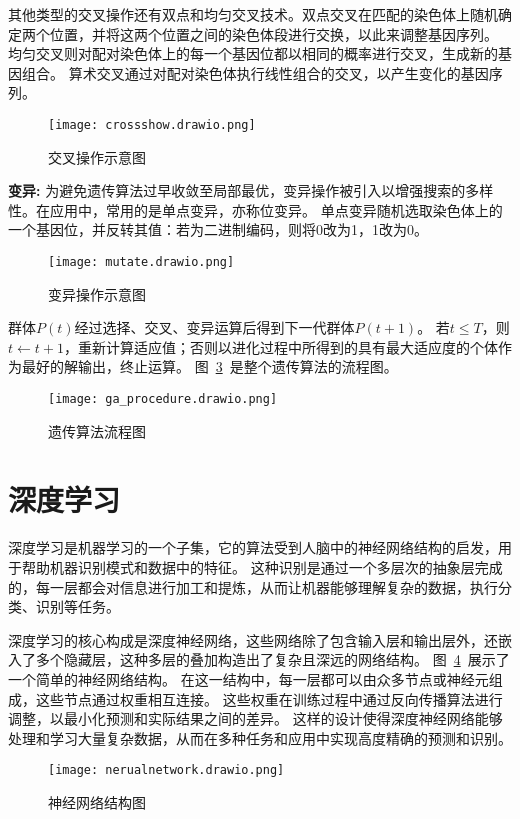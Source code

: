 其他类型的交叉操作还有双点和均匀交叉技术。双点交叉在匹配的染色体上随机确定两个位置，并将这两个位置之间的染色体段进行交换，以此来调整基因序列。
均匀交叉则对配对染色体上的每一个基因位都以相同的概率进行交叉，生成新的基因组合。
算术交叉通过对配对染色体执行线性组合的交叉，以产生变化的基因序列。
\begin{figure}[htbp]
  \centering
  \texttt{[image: crossshow.drawio.png]}
  \caption{交叉操作示意图}
  \label{fig:cross_show}
\end{figure}

\textbf{变异:}
为避免遗传算法过早收敛至局部最优，变异操作被引入以增强搜索的多样性。在应用中，常用的是单点变异，亦称位变异。
单点变异随机选取染色体上的一个基因位，并反转其值：若为二进制编码，则将0改为1，1改为0。
\begin{figure}[htbp]
  \centering
  \texttt{[image: mutate.drawio.png]}
  \caption{变异操作示意图}
  \label{fig:mutate}
\end{figure}

群体$P(t)$经过选择、交叉、变异运算后得到下一代群体$P(t+1)$。
若$t\leq T$，则 $t \leftarrow t + 1$，重新计算适应值；否则以进化过程中所得到的具有最大适应度的个体作为最好的解输出，终止运算。
图~\ref{fig:ga_procedure}~是整个遗传算法的流程图。
\begin{figure}[htbp]
  \centering
  \texttt{[image: ga\_procedure.drawio.png]}
  \caption{遗传算法流程图}
  \label{fig:ga_procedure}
\end{figure}


\section{深度学习}
深度学习是机器学习的一个子集，它的算法受到人脑中的神经网络结构的启发，用于帮助机器识别模式和数据中的特征。
这种识别是通过一个多层次的抽象层完成的，每一层都会对信息进行加工和提炼，从而让机器能够理解复杂的数据，执行分类、识别等任务。

深度学习的核心构成是深度神经网络，这些网络除了包含输入层和输出层外，还嵌入了多个隐藏层，这种多层的叠加构造出了复杂且深远的网络结构。
图~\ref{fig:nerualnetwork}~展示了一个简单的神经网络结构。
在这一结构中，每一层都可以由众多节点或神经元组成，这些节点通过权重相互连接。
这些权重在训练过程中通过反向传播算法进行调整，以最小化预测和实际结果之间的差异。
这样的设计使得深度神经网络能够处理和学习大量复杂数据，从而在多种任务和应用中实现高度精确的预测和识别。

\begin{figure}[htbp]
  \centering
  \texttt{[image: nerualnetwork.drawio.png]}
  \caption{神经网络结构图}
  \label{fig:nerualnetwork}
\end{figure}

